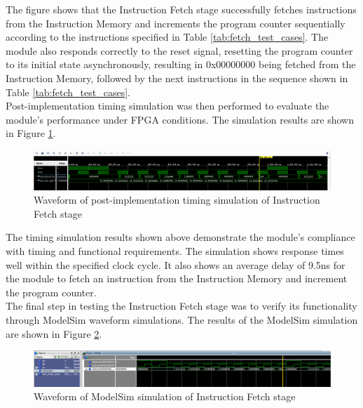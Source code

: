 \documentclass[CMPE]{../KGCOEReport}
\begin{document}
The figure shows that the Instruction Fetch stage successfully fetches instructions from the Instruction Memory and increments the program counter sequentially according to the instructions specified in Table \ref{tab:fetch_test_cases}. The module also responds correctly to the reset signal, resetting the program counter to its initial state asynchronously, resulting in 0x00000000 being fetched from the Instruction Memory, followed by the next instructions in the sequence shown in Table \ref{tab:fetch_test_cases}.
\\

Post-implementation timing simulation was then performed to evaluate the module's performance under FPGA conditions. The simulation results are shown in Figure \ref{fig:implement_fetch}.

\begin{figure}[H]
    \centering
    \includegraphics[width=1\textwidth]{implement_fetch.png}
    \caption{Waveform of post-implementation timing simulation of Instruction Fetch stage}
    \label{fig:implement_fetch}
\end{figure}

The timing simulation results shown above demonstrate the module's compliance with timing and functional requirements. The simulation shows response times well within the specified clock cycle. It also shows an average delay of 9.5ns for the module to fetch an instruction from the Instruction Memory and increment the program counter.
\\

The final step in testing the Instruction Fetch stage was to verify its functionality through ModelSim waveform simulations. The results of the ModelSim simulation are shown in Figure \ref{fig:modelsim}.

\begin{figure}[H]
    \centering
    \includegraphics[width=1\textwidth]{modelsim.png}
    \caption{Waveform of ModelSim simulation of Instruction Fetch stage}
    \label{fig:modelsim}
\end{figure}
\end{document}
